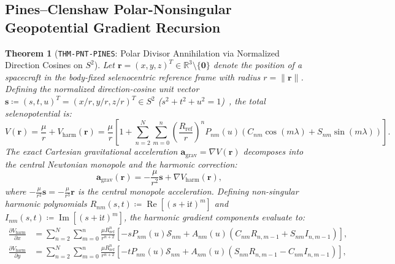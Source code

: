 \documentclass[11pt,a4paper,reqno]{article}
\theoremstyle{plain}
\newtheorem{theorem}{Theorem}[section]
\theoremstyle{definition}
\theoremstyle{remark}
\numberwithin{equation}{section}
\begin{document}
\subsection{Pines--Clenshaw Polar-Nonsingular Geopotential Gradient Recursion}
\label{subsec:pnt_pines_clenshaw}

\begin{theorem}[\texttt{THM-PNT-PINES}: Polar Divisor Annihilation via Normalized Direction Cosines on $S^2$]
\label{thm:pnt_pines_recursion}
Let $\mathbf{r} = (x, y, z)^T \in \mathbb{R}^3 \setminus \{\mathbf{0}\}$ denote the position of a spacecraft in the body-fixed selenocentric reference frame with radius $r = \|\mathbf{r}\|$. Defining the normalized direction-cosine unit vector $\mathbf{s} \coloneqq (s, t, u)^T = (x/r, y/r, z/r)^T \in S^2$ ($s^2 + t^2 + u^2 = 1$)~\cite{pines1973}, the total selenopotential is:
\begin{equation}
  V(\mathbf{r}) = \frac{\mu}{r} + V_{\mathrm{harm}}(\mathbf{r}) = \frac{\mu}{r} \left[ 1 + \sum_{n=2}^N \sum_{m=0}^n \left( \frac{R_{\mathrm{ref}}}{r} \right)^n P_{nm}(u) \left( C_{nm} \cos(m\lambda) + S_{nm} \sin(m\lambda) \right) \right].
\end{equation}
The exact Cartesian gravitational acceleration $\mathbf{a}_{\mathrm{grav}} = \nabla V(\mathbf{r})$ decomposes into the central Newtonian monopole and the harmonic correction:
\begin{equation}
  \mathbf{a}_{\mathrm{grav}}(\mathbf{r}) = -\frac{\mu}{r^2} \mathbf{s} + \nabla V_{\mathrm{harm}}(\mathbf{r}),
  \label{eq:pnt_pines_total_gradient}
\end{equation}
where $-\frac{\mu}{r^2}\mathbf{s} = -\frac{\mu}{r^3}\mathbf{r}$ is the central monopole acceleration. Defining non-singular harmonic polynomials $R_{nm}(s, t) \coloneqq \operatorname{Re}[(s + \mathrm{i} t)^m]$ and $I_{nm}(s, t) \coloneqq \operatorname{Im}[(s + \mathrm{i} t)^m]$, the harmonic gradient components evaluate to:
\begin{equation}
  \begin{split}
    \frac{\partial V_{\mathrm{harm}}}{\partial x} &= \sum_{n=2}^N \sum_{m=0}^n \frac{\mu R_{\mathrm{ref}}^n}{r^{n+2}} \left[ -s P_{nm}(u) \mathcal{S}_{nm} + A_{nm}(u) \left( C_{nm} R_{n,m-1} + S_{nm} I_{n,m-1} \right) \right], \\
    \frac{\partial V_{\mathrm{harm}}}{\partial y} &= \sum_{n=2}^N \sum_{m=0}^n \frac{\mu R_{\mathrm{ref}}^n}{r^{n+2}} \left[ -t P_{nm}(u) \mathcal{S}_{nm} + A_{nm}(u) \left( S_{nm} R_{n,m-1} - C_{nm} I_{n,m-1} \right) \right], \\

\end{split}
\end{equation}
\end{theorem}
\end{document}
